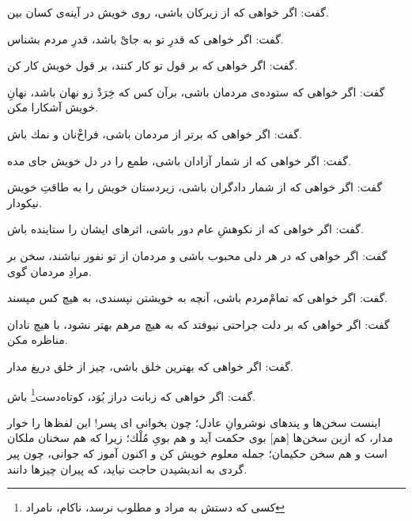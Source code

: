 گفت: اگر خواهى كه از زيركان باشى، روى خويش در آينه‌ی كسان بين.

گفت: اگر خواهى كه قدرِ تو به‌ جاىْ باشد، قدرِ مردم بشناس.

گفت: اگر خواهى كه بر قول تو كار كنند، بر قول خويش كار كن.

گفت: اگر خواهى كه ستوده‌ی مردمان باشى، برآن كس كه خِرَدْ زو نهان باشد، نهانِ خويش آشكارا مكن.

گفت: اگر خواهى كه برتر از مردمان باشى، فراخ‌ْ‌‌نان‌‌ و‌‌ نمك باش.

گفت: اگر خواهى كه از شمار آزادان باشى، طمع را در دل خويش جاى مده.

گفت: اگر خواهى كه از شمار دادگران باشى، زيردستان خويش را به طاقتِ خويش نيكودار.

گفت: اگر خواهى كه از نكوهشِ عام دور باشى، اثرهاى ايشان را ستاينده باش.

گفت: اگر خواهى كه در هر دلى محبوب باشى و مردمان از تو نفور نباشند، سخن بر مرادِ مردمان گوى.

گفت: اگر خواهى كه تمامْ‌مردم باشى، آنچه به خويشتن نپسندى، به هيچ كس مپسند.

گفت: اگر خواهى كه بر دلت جراحتى نيوفتد كه به هيچ مرهم بهتر نشود، با هيچ نادان مناظره مكن.

گفت: اگر خواهى كه بهترين خلق باشى، چيز از خلق دريغ مدار.

گفت: اگر خواهى كه زبانت دراز بُوَد، كوتاه‌دست\footnote{کسی که دستش به مراد و مطلوب نرسد، ناکام، نامراد} باش.

اينست سخن‌ها و پندهاى نوشروانِ عادل؛ چون بخوانى اى پسر! اين لفظ‌ها را خوار مدار، كه ازين سخن‌ها [هم] بوى حكمت آيد و هم بوىِ مُلْك؛ زيرا كه هم سخنان ملكان است و هم سخن حكيمان؛ جمله معلوم خويش كن و اكنون آموز كه جوانى، چون پير گردى به انديشيدن حاجت نيايد، كه پيران چيزها دانند.


 	\newpage



























